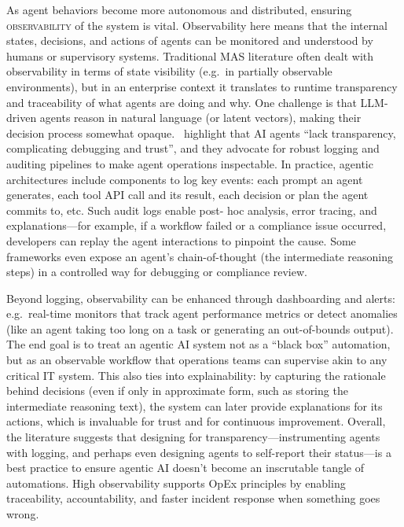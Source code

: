 As agent behaviors become more autonomous and distributed, ensuring \textsc{observability} of the system is vital. Observability here means that the internal states, decisions, and actions of agents can be monitored and understood by humans or supervisory systems. Traditional MAS literature often dealt with observability in terms of state visibility (e.g.~in partially observable environments), but in an enterprise context it translates to runtime transparency and traceability of what agents are doing and why. One challenge is that LLM-driven agents reason in natural language (or latent vectors), making their decision process somewhat opaque.~\textcite{sapkotaAI2026} highlight that AI agents “lack transparency, complicating debugging and trust”, and they advocate for robust logging and auditing pipelines to make agent operations inspectable. In practice, agentic architectures include components to log key events: each prompt an agent generates, each tool API call and its result, each decision or plan the agent commits to, etc. Such audit logs enable post- hoc analysis, error tracing, and explanations—for example, if a workflow failed or a compliance issue occurred, developers can replay the agent interactions to pinpoint the cause. Some frameworks even expose an agent's chain-of-thought (the intermediate reasoning steps) in a controlled way for debugging or compliance review.

Beyond logging, observability can be enhanced through dashboarding and alerts: e.g.~real-time monitors that track agent performance metrics or detect anomalies (like an agent taking too long on a task or generating an out-of-bounds output). The end goal is to treat an agentic AI system not as a “black box” automation, but as an observable workflow that operations teams can supervise akin to any critical IT system. This also ties into explainability: by capturing the rationale behind decisions (even if only in approximate form, such as storing the intermediate reasoning text), the system can later provide explanations for its actions, which is invaluable for trust and for continuous improvement. Overall, the literature suggests that designing for transparency—instrumenting agents with logging, and perhaps even designing agents to self-report their status—is a best practice to ensure agentic AI doesn't become an inscrutable tangle of automations. High observability supports OpEx principles by enabling traceability, accountability, and faster incident response when something goes wrong. %

